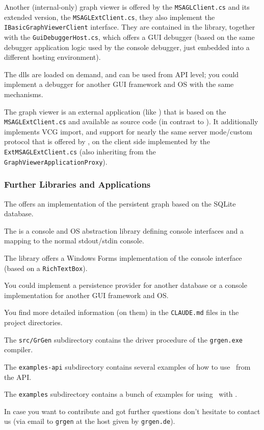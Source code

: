 Another (internal-only) graph viewer is offered by the \texttt{MSAGL\-Client.cs} and its extended version, the \texttt{MSAGL\-Ext\-Client.cs}, they also implement the \texttt{IBasic\-Graph\-Viewer\-Client} interface.
They are contained in the \GraphViewerAndSequenceDebuggerWindowsForms{} library, together with the \texttt{Gui\-Debugger\-Host.cs}, which offers a GUI debugger (based on the same debugger application logic used by the console debugger, just embedded into a different hosting environment).

The dlls are loaded on demand, and can be used from API level; you could implement a debugger for another GUI framework and OS with the same mechanisms.

The graph viewer \extMSAGLExt{} is an external application (like \yComp{}) that is based on the \texttt{MSAGL\-Ext\-Client.cs} and available as source code (in contrast to \yComp{}).
It additionally implements VCG import, and support for nearly the same server mode/custom protocol that is offered by \yComp{}, on the client side implemented by the \texttt{Ext\-MSAGL\-Ext\-Client.cs} (also inheriting from the \texttt{Graph\-Viewer\-Application\-Proxy}).


\subsubsection*{Further Libraries and Applications}

The \LibGrPersistenceProviderSQLite{} offers an implementation of the persistent graph based on the SQLite database.

The \LibConsoleAndOS{} is a console and OS abstraction library defining console interfaces and a mapping to the normal stdout/stdin console.

The \LibConsoleAndOSWindowsForms{} library offers a Windows Forms implementation of the console interface (based on a \texttt{RichTextBox}).

You could implement a persistence provider for another database or a console implementation for another GUI framework and OS. 

You find more detailed information (on them) in the \texttt{CLAUDE.md} files in the project directories.

The \texttt{src/GrGen} subdirectory contains the driver procedure of the \texttt{grgen.exe} compiler.

The \texttt{examples-api} subdirectory contains several examples of how to use \GrG~from the API.

The \texttt{examples} subdirectory contains a bunch of examples for using \GrG~with \GrShell{}.

In case you want to contribute and got further questions don't hesitate to contact us 
(via email to \texttt{grgen} at the host given by \texttt{grgen.de}).


